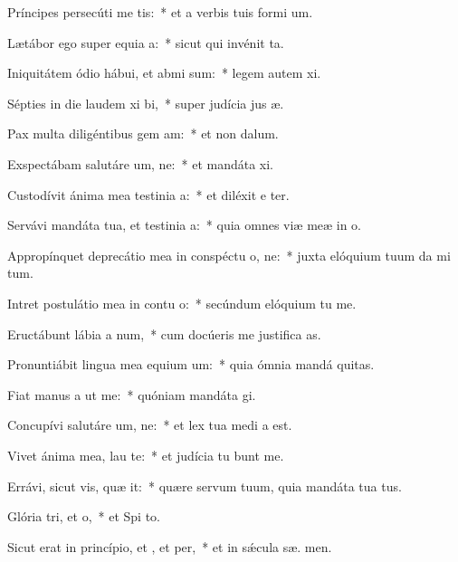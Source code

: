 \item Príncipes persecúti  me tis:~* et a verbis tuis formi  um.
\item Lætábor ego super equia a:~* sicut qui invénit  ta.
\item Iniquitátem ódio hábui, et abmi sum:~* legem autem  xi.
\item Sépties in die laudem xi bi,~* super judícia jus æ.
\item Pax multa diligéntibus gem am:~* et non   dalum.
\item Exspectábam salutáre um, ne:~* et mandáta  xi.
\item Custodívit ánima mea testinia a:~* et diléxit e ter.
\item Servávi mandáta tua, et testinia a:~* quia omnes viæ meæ in  o.
\item Appropínquet deprecátio mea in conspéctu o, ne:~* juxta elóquium tuum da mi tum.
\item Intret postulátio mea in contu o:~* secúndum elóquium tu  me.
\item Eructábunt lábia a num,~* cum docúeris me justifica as.
\item Pronuntiábit lingua mea equium um:~* quia ómnia mandá  quitas.
\item Fiat manus a ut  me:~* quóniam mandáta  gi.
\item Concupívi salutáre um, ne:~* et lex tua medi a est.
\item Vivet ánima mea,  lau te:~* et judícia tu bunt me.
\item Errávi, sicut vis, quæ it:~* quære servum tuum, quia mandáta tua   tus.
\item Glória tri, et o,~* et Spi to.
\item Sicut erat in princípio, et , et per,~* et in sǽcula sæ. men.
